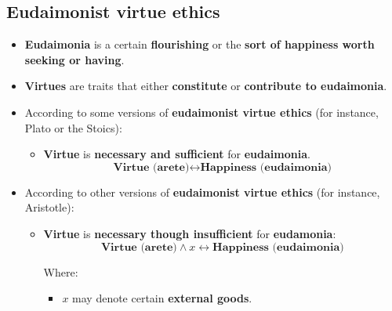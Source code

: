 \documentclass[11pt]{article}
\begin{document}
\subsection{Eudaimonist virtue ethics}
\label{sec:orgcf4b069}
\begin{itemize}
\item \textbf{Eudaimonia} is a certain \textbf{flourishing} or the \textbf{sort of happiness worth seeking or having}.
\item \textbf{Virtues} are traits that either \textbf{constitute} or \textbf{contribute to eudaimonia}.
\item According to some versions of \textbf{eudaimonist virtue ethics} (for instance, Plato or the Stoics):
\begin{itemize}
\item \textbf{Virtue} is \textbf{necessary and sufficient} for \textbf{eudaimonia}.
\[\textbf{Virtue (arete)} \leftrightarrow \textbf{Happiness (eudaimonia)}\]
\end{itemize}
\item According to other versions of \textbf{eudaimonist virtue ethics} (for instance, Aristotle):
\begin{itemize}
\item \textbf{Virtue} is \textbf{necessary though insufficient} for \textbf{eudamonia}:
\[\textbf{Virtue (arete)} \wedge x \leftrightarrow \textbf{Happiness (eudaimonia)}\]

Where:
\begin{itemize}
\item \(x\) may denote certain \textbf{external goods}.
\end{itemize}
\end{itemize}
\end{itemize}

 \newpage
\end{document}
